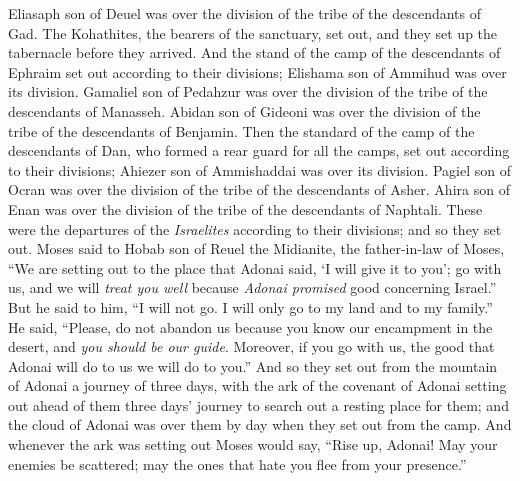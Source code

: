 \begin{biblechapter}
\verse Eliasaph son of Deuel was over the division of the tribe of the descendants of Gad.
\verse The Kohathites, the bearers of the sanctuary, set out, and they set up the tabernacle before they arrived.
\verse And the stand of the camp of the descendants of Ephraim set out according to their divisions; Elishama son of Ammihud was over its division.
\verse Gamaliel son of Pedahzur was over the division of the tribe of the descendants of Manasseh.
\verse Abidan son of Gideoni was over the division of the tribe of the descendants of Benjamin.
\verse Then the standard of the camp of the descendants of Dan, who formed a rear guard for all the camps, set out according to their divisions; Ahiezer son of Ammishaddai was over its division.
\verse Pagiel son of Ocran was over the division of the tribe of the descendants of Asher.
\verse Ahira son of Enan was over the division of the tribe of the descendants of Naphtali.
\verse These were the departures of the \textit{Israelites} according to their divisions; and so they set out.
\verse Moses said to Hobab son of Reuel the Midianite, the father-in-law of Moses, “We are setting out to the place that Adonai said, ‘I will give it to you’; go with us, and we will \textit{treat you well} because \textit{Adonai promised} good concerning Israel.”
\verse But he said to him, “I will not go. I will only go to my land and to my family.”
\verse He said, “Please, do not abandon us because you know our encampment in the desert, and \textit{you should be our guide}.
\verse Moreover, if you go with us, the good that Adonai will do to us we will do to you.”
\verse And so they set out from the mountain of Adonai a journey of three days, with the ark of the covenant of Adonai setting out ahead of them three days’ journey to search out a resting place for them;
\verse and the cloud of Adonai was over them by day when they set out from the camp.
\verse And whenever the ark was setting out Moses would say,
\verse “Rise up, Adonai! 
May your enemies be scattered; 
may the ones that hate you flee from your presence.”
\end{biblechapter}

